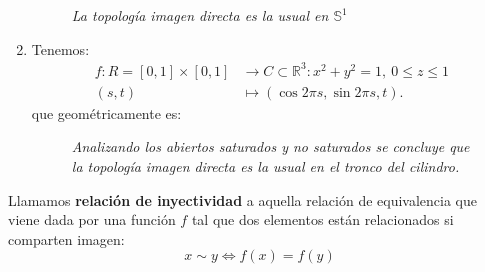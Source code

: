 \begin{ej}
\begin{enumerate}
\begin{figure}[H]
        \caption{\textit{La topología imagen directa es la usual en $\mathbb{S}^1$}}
        \label{fig:proyeccion_exponencial_img_directa}
    \end{figure}

    \item Tenemos:
    \begin{align*}
        f: R = \left[ 0, 1 \right] \times \left[ 0, 1 \right] &\rightarrow C \subset \mathbb{R}^3: x^2 + y^2 = 1,\ 0 \le z \le 1\\
        \left( s, t \right) &\mapsto \left( \cos 2\pi s, \sin 2\pi s, t \right) 
    .\end{align*}
    que geométricamente es:
    \begin{figure}[H]
        \centering
        \caption{\textit{Analizando los abiertos saturados y no saturados se concluye que la topología imagen directa es la usual en el tronco del cilindro.}}
        \label{fig:rectángulo-a-cilindro-por-imagen-directa.}
    \end{figure}
\end{enumerate}
\end{ej}

\begin{defi}
Llamamos \textbf{relación de inyectividad} a aquella relación de equivalencia que viene dada por una función $f$ tal que dos elementos están relacionados si comparten imagen:
\[
x \sim y \Leftrightarrow f\left( x \right) = f\left( y \right)
\]
\end{defi}


